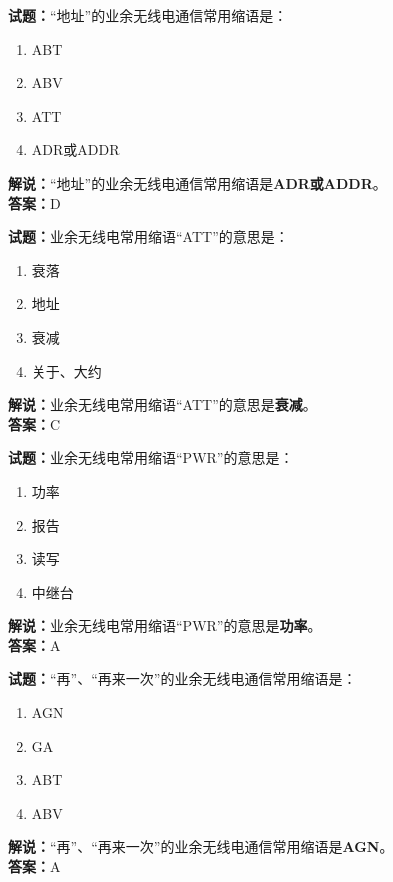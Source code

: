 \documentclass{ctexbook}
\begin{document}
\bigskip


\noindent\textbf{试题：}“地址”的业余无线电通信常用缩语是：
\begin{enumerate}[leftmargin=3em]
\item ABT
\item ABV
\item ATT
\item ADR或ADDR
\end{enumerate}
\noindent\textbf{解说：}“地址”的业余无线电通信常用缩语是\textbf{ADR或ADDR}。\\\noindent\textbf{答案：}D




\bigskip


\noindent\textbf{试题：}业余无线电常用缩语“ATT”的意思是：
\begin{enumerate}[leftmargin=3em]
\item 衰落
\item 地址
\item 衰减
\item 关于、大约
\end{enumerate}
\noindent\textbf{解说：}业余无线电常用缩语“ATT”的意思是\textbf{衰减}。\\\noindent\textbf{答案：}C



\bigskip


\noindent\textbf{试题：}业余无线电常用缩语“PWR”的意思是：
\begin{enumerate}[leftmargin=3em]
\item 功率
\item 报告
\item 读写
\item 中继台
\end{enumerate}
\noindent\textbf{解说：}业余无线电常用缩语“PWR”的意思是\textbf{功率}。\\\noindent\textbf{答案：}A



\bigskip


\noindent\textbf{试题：}“再”、“再来一次”的业余无线电通信常用缩语是：
\begin{enumerate}[leftmargin=3em]
\item AGN
\item GA
\item ABT
\item ABV
\end{enumerate}
\noindent\textbf{解说：}“再”、“再来一次”的业余无线电通信常用缩语是\textbf{AGN}。\\\noindent\textbf{答案：}A
\end{document}
